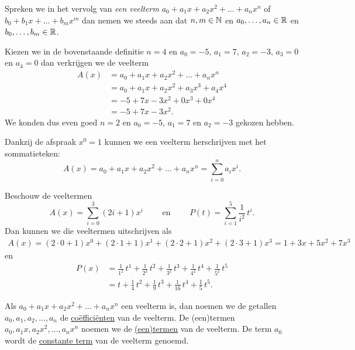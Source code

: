 \documentclass{ximera}
\begin{document}
Spreken we in het vervolg van {\em een veelterm} $a_0 + a_1x + a_2x^2 + \dots + a_n x^n$ of $b_0 + b_1x + \dots + b_m x^m$ dan nemen we steeds aan dat $n,m\in \mathbb{N}$ en $a_0, \ldots, a_n\in \mathbb{R}$ en $b_0, \ldots, b_m\in \mathbb{R}$.

\begin{example} 
Kiezen we in de bovenstaande definitie $n = 4$ en $a_0 = -5$, $a_1 = 7$, $a_2 = -3$, $a_3 = 0$ en $a_4 = 0$ dan verkrijgen we de veelterm
\begin{align*}
A(x) 
& = a_0 + a_1x + a_2x^2 + \dots + a_n x^n \\
& = a_0 + a_1x + a_2x^2 + a_3 x^3 + a_4 x^4 \\ 
& = -5 + 7x - 3x^2 + 0x^3 + 0x^4 \\
& = -5 + 7x - 3x^2.
\end{align*}
We konden dus even goed $n = 2$ en $a_0 = -5$, $a_1 = 7$ en $a_2 = -3$ gekozen hebben. 
\end{example} 

Dankzij de afspraak $x^0 = 1$ kunnen we een veelterm herschrijven met het sommatieteken:
\[
A(x) = a_0 + a_1x + a_2x^2 + \dots + a_n x^n = \sum_{i=0}^n a_i x^i.
\]

\begin{example} 
Beschouw de veeltermen
\[
A(x) = \sum_{i=0}^3 (2i+1) x^i \qquad \text{ en } \qquad P(t) = \sum_{i=1}^5 \frac{1}{i^2} \, t^i.
\] 
Dan kunnen we die veeltermen uitschrijven als
\begin{align*}
A(x)  = (2\cdot0+1)x^0 + (2\cdot1+1)x^1 + (2\cdot2+1)x^2 + (2\cdot3+1)x^3 = 1 + 3x + 5x^2 + 7x^3
\end{align*}
en
\begin{align*}
P(x) 
& = \frac{1}{1^2} \, t^1 + \frac{1}{2^2} \, t^2 + \frac{1}{3^2} \, t^3 + \frac{1}{4^2} \, t^4 + \frac{1}{5^2} \, t^5 \\
& = t + \frac{1}{4}\,t^2 + \frac{1}{9}\,t^3 + \frac{1}{16}\,t^4 + \frac{1}{5}\,t^5.
\end{align*}
\end{example} 

Als $a_0 + a_1x + a_2x^2 + \dots + a_n x^n$ een veelterm is, dan noemen we de getallen $a_0, a_1, a_2, \ldots, a_n$ de \underline{co\"effici\"enten} van de veelterm. De (een)termen $a_0, a_1x, a_2x^2, \ldots , a_nx^n$ noemen we de \underline{(een)termen} van de veelterm. De term $a_0$ wordt de \underline{constante term} van de veelterm genoemd.
\end{document}
